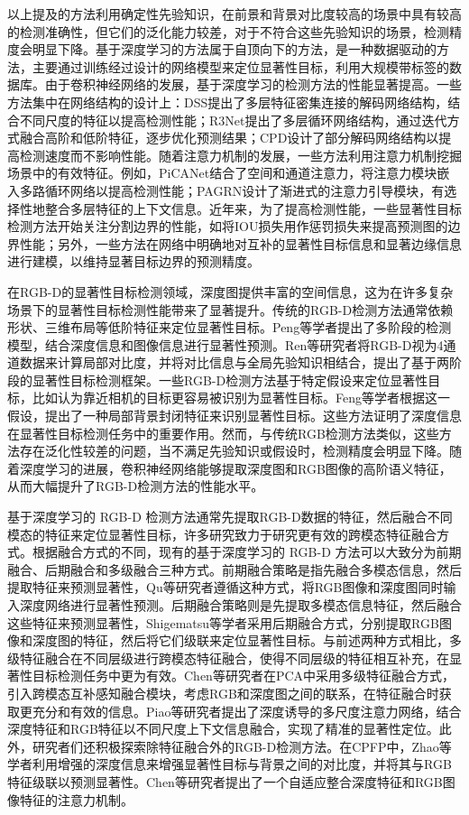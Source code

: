 以上提及的方法利用确定性先验知识，在前景和背景对比度较高的场景中具有较高的检测准确性，但它们的泛化能力较差，对于不符合这些先验知识的场景，检测精度会明显下降。基于深度学习的方法属于自顶向下的方法，是一种数据驱动的方法，主要通过训练经过设计的网络模型来定位显著性目标，利用大规模带标签的数据库。由于卷积神经网络的发展，基于深度学习的检测方法的性能显著提高。一些方法集中在网络结构的设计上：DSS提出了多层特征密集连接的解码网络结构，结合不同尺度的特征以提高检测性能；R3Net提出了多层循环网络结构，通过迭代方式融合高阶和低阶特征，逐步优化预测结果；CPD设计了部分解码网络结构以提高检测速度而不影响性能。随着注意力机制的发展，一些方法利用注意力机制挖掘场景中的有效特征。例如，PiCANet结合了空间和通道注意力，将注意力模块嵌入多路循环网络以提高检测性能；PAGRN设计了渐进式的注意力引导模块，有选择性地整合多层特征的上下文信息。近年来，为了提高检测性能，一些显著性目标检测方法开始关注分割边界的性能，如将IOU损失用作惩罚损失来提高预测图的边界性能；另外，一些方法在网络中明确地对互补的显著性目标信息和显著边缘信息进行建模，以维持显著目标边界的预测精度。




在RGB-D的显著性目标检测领域，深度图提供丰富的空间信息，这为在许多复杂场景下的显著性目标检测性能带来了显著提升。传统的RGB-D检测方法通常依赖形状、三维布局等低阶特征来定位显著性目标。Peng等学者提出了多阶段的检测模型，结合深度信息和图像信息进行显著性预测。Ren等研究者将RGB-D视为4通道数据来计算局部对比度，并将对比信息与全局先验知识相结合，提出了基于两阶段的显著性目标检测框架。一些RGB-D检测方法基于特定假设来定位显著性目标，比如认为靠近相机的目标更容易被识别为显著性目标。Feng等学者根据这一假设，提出了一种局部背景封闭特征来识别显著性目标。这些方法证明了深度信息在显著性目标检测任务中的重要作用。然而，与传统RGB检测方法类似，这些方法存在泛化性较差的问题，当不满足先验知识或假设时，检测精度会明显下降。随着深度学习的进展，卷积神经网络能够提取深度图和RGB图像的高阶语义特征，从而大幅提升了RGB-D检测方法的性能水平。


基于深度学习的 RGB-D 检测方法通常先提取RGB-D数据的特征，然后融合不同模态的特征来定位显著性目标，许多研究致力于研究更有效的跨模态特征融合方式。根据融合方式的不同，现有的基于深度学习的 RGB-D 方法可以大致分为前期融合、后期融合和多级融合三种方式。前期融合策略是指先融合多模态信息，然后提取特征来预测显著性，Qu等研究者遵循这种方式，将RGB图像和深度图同时输入深度网络进行显著性预测。后期融合策略则是先提取多模态信息特征，然后融合这些特征来预测显著性，Shigematsu等学者采用后期融合方式，分别提取RGB图像和深度图的特征，然后将它们级联来定位显著性目标。与前述两种方式相比，多级特征融合在不同层级进行跨模态特征融合，使得不同层级的特征相互补充，在显著性目标检测任务中更为有效。Chen等研究者在PCA中采用多级特征融合方式，引入跨模态互补感知融合模块，考虑RGB和深度图之间的联系，在特征融合时获取更充分和有效的信息。Piao等研究者提出了深度诱导的多尺度注意力网络，结合深度特征和RGB特征以不同尺度上下文信息融合，实现了精准的显著性定位。此外，研究者们还积极探索除特征融合外的RGB-D检测方法。在CPFP中，Zhao等学者利用增强的深度信息来增强显著性目标与背景之间的对比度，并将其与RGB特征级联以预测显著性。Chen等研究者提出了一个自适应整合深度特征和RGB图像特征的注意力机制。


